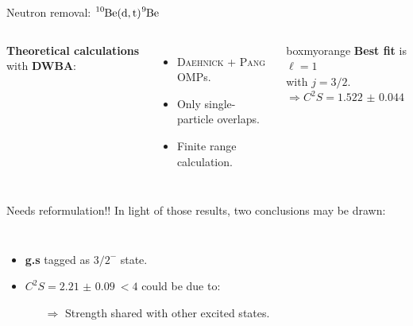 \documentclass[sans,
frameno, %
mp,
usenames,dvipsnames, %
onlytextwidth, %
t,%
11pt]{beamer}
\newcommand{\notice}[1]{\textbf{\alert{#1}}}
\newcommand{\iso}[2]{\ce{^{#1}#2}}
\begin{document}
\begin{frame}{Neutron removal: $\iso{10}{Be}(\textrm{d}, \textrm{t})\iso{9}{Be}$}
{\begin{figure}
\begin{minipage}[t]{0.48\linewidth}
            \end{minipage}
        \end{figure}
        \medskip
        \begin{columns}
            {
                \notice{Theoretical calculations} with \textbf{DWBA}:
                \begin{itemize}
                    \item \textsc{Daehnick} + \textsc{Pang} OMPs.
                    \item Only single-particle overlaps.
                    \item Finite range calculation.
                \end{itemize}
            }\hfill
            {

                \begin{beamercolorbox}[sep=1ex, center, rounded=true]{boxmyorange}
                    \textbf{Best fit} is $\ell = 1$\\
                    with $j = 3/2$.\\
                    $\Rightarrow C^2S = \qty{1.522(44)}{}$
                \end{beamercolorbox}

            }
        \end{columns}

    }
    \only<+>
    {
        \addtocounter{framenumber}{1}
        \alert{Needs reformulation!!}
        In light of those results, two conclusions may be drawn:

        \bigskip
        \begin{columns}[c]
            {
                \begin{itemize}
                    \setlength\itemsep{1em}
                    \item \iso{9}{Be} \textbf{g.s} tagged as $3/2^{-}$ state.
                    \item $C^2S = \qty{2.21(9)}{} < 4$ could be due to:

                          \bigskip
                          \begin{itemize}
                              \setlength\itemsep{1em}
                              \item[$\Rightarrow$] Strength shared with other excited states.


\end{itemize}
\end{itemize}}
\end{columns}}
\end{frame}
\end{document}
